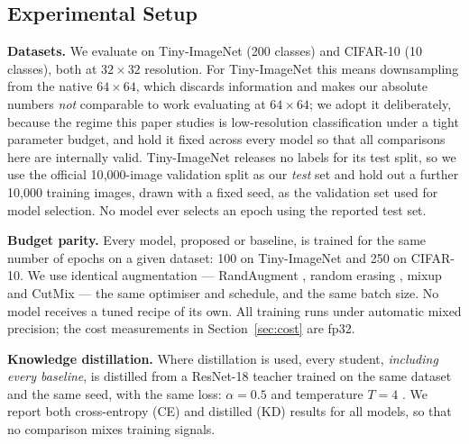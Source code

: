 
\subsection{Experimental Setup}
\label{sec:setup}

\textbf{Datasets.} We evaluate on Tiny-ImageNet \cite{tinyimagenet} (200
classes) and CIFAR-10 \cite{cifar} (10 classes), both at $32\times32$
resolution. For Tiny-ImageNet this means downsampling from the native
$64\times64$, which discards information and makes our absolute numbers
\emph{not} comparable to work evaluating at $64\times64$; we adopt it
deliberately, because the regime this paper studies is low-resolution
classification under a tight parameter budget, and hold it fixed across every
model so that all comparisons here are internally valid. Tiny-ImageNet
releases no labels for its test split, so we use the official
10{,}000-image validation split as our \emph{test} set and hold out a further
10{,}000 training images, drawn with a fixed seed, as the validation set used
for model selection. No model ever selects an epoch using the reported test
set.

\textbf{Budget parity.} Every model, proposed or baseline, is trained for the
same number of epochs on a given dataset: 100 on Tiny-ImageNet and 250 on
CIFAR-10. We use identical augmentation --- RandAugment \cite{randaugment},
random erasing \cite{randomerasing}, mixup \cite{mixup} and CutMix
\cite{cutmix} --- the same optimiser and schedule, and the same batch size. No
model receives a tuned recipe of its own. All training runs under automatic
mixed precision; the cost measurements in Section~\ref{sec:cost} are fp32.

\textbf{Knowledge distillation.} Where distillation is used, every student,
\emph{including every baseline}, is distilled from a ResNet-18 teacher
\cite{resnet} trained on the same dataset and the same seed, with the same
loss: $\alpha = 0.5$ and temperature $T = 4$ \cite{hinton}. We report both
cross-entropy (CE) and distilled (KD) results for all models, so that no
comparison mixes training signals.

